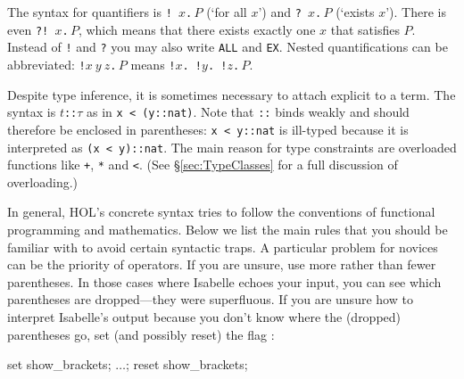 The syntax for quantifiers is
\texttt{!~$x$.$\,P$} (`for all $x$') and
\texttt{?~$x$.$\,P$} (`exists $x$').
There is even \texttt{?!~$x$.$\,P$}, which
means that there exists exactly one $x$ that satisfies $P$. Instead of
\texttt{!} and \texttt{?} you may also write \texttt{ALL} and \texttt{EX}.
Nested quantifications can be abbreviated:
\texttt{!$x~y~z$.$\,P$} means \texttt{!$x$.~!$y$.~!$z$.$\,P$}.

Despite type inference, it is sometimes necessary to attach explicit
 to a term.  The syntax is \texttt{$t$::$\tau$} as
in \texttt{x < (y::nat)}. Note that \texttt{::} binds weakly and should
therefore be enclosed in parentheses: \texttt{x < y::nat} is ill-typed
because it is interpreted as \texttt{(x < y)::nat}. The main reason for type
constraints are overloaded functions like \texttt{+}, \texttt{*} and
\texttt{<}. (See \S\ref{sec:TypeClasses} for a full discussion of
overloading.)

\begin{warn}
In general, HOL's concrete syntax tries to follow the conventions of
functional programming and mathematics. Below we list the main rules that you
should be familiar with to avoid certain syntactic traps. A particular
problem for novices can be the priority of operators. If you are unsure, use
more rather than fewer parentheses. In those cases where Isabelle echoes your
input, you can see which parentheses are dropped---they were superfluous. If
you are unsure how to interpret Isabelle's output because you don't know
where the (dropped) parentheses go, set (and possibly reset) the flag
:
\begin{ttbox}
set show_brackets; \(\dots\); reset show_brackets;
\end{ttbox}
\end{warn}

